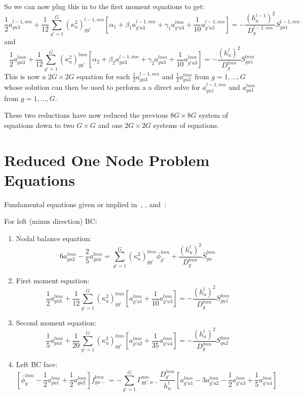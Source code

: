 So we can now plug this in to the first moment equations to get:
\[
\frac{1}{2}a_{gu3}^{l-1,mn}+\frac{1}{12}\sum_{g'=1}^G(\kappa_u^2)_{gg'}^{l-1,mn}\left[\alpha_1+\beta_1a_{g'u3}^{l-1,mn}+\gamma_1a_{g'u3}^{lmn}+\frac{1}{10}a_{g'u3}^{l-1,mn}\right]=-\frac{(h_u^{l-1})^2}{D_g^{l-1,mn}}S_{gu1}^{l-1,mn}
\]
and
\[
\frac{1}{2}a_{gu3}^{lmn}+\frac{1}{12}\sum_{g'=1}^G(\kappa_u^2)_{gg'}^{lmn}\left[\alpha_2+\beta_2a_{gu3}^{l-1,mn}+\gamma_2a_{gu3}^{lmn}+\frac{1}{10}a_{g'u3}^{lmn}\right]=-\frac{(h_u^{l})^2}{D_g^{lmn}}S_{gu1}^{lmn}
\]
This is now a $2G\times 2G$ equation for each $\frac{1}{2}a_{gu3}^{l-1,mn}$ and $\frac{1}{2}a_{gu3}^{lmn}$ from $g=1,\dots,G$ whose solution can then be used to perform a a direct solve for $a_{gu1}^{l-1,mn}$ and $a_{gu1}^{lmn}$ from $g=1,\dots,G$.

These two reductions have now reduced the previous $8G\times 8G$ system of equations down to two $G\times G$ and one $2G\times 2G$ systems of equations.

\section{Reduced One Node Problem Equations}

Fundamental equations given or implied in~\cite{GehinPhD}, \cite{SmithMS}, and~\cite{Smith1983Nonlinear}:

For left (minus direction) BC:
\begin{enumerate}
    \item Nodal balance equation:
        \[
        6a_{gu2}^{lmn}-\frac{2}{5}a_{gu4}^{lmn}=\sum_{g'=1}^G(\kappa_u^2)_{gg'}^{lmn}\bar{\phi}_{g'}^{lmn}+\frac{(h_u^{l})^2}{D_g^{lmn}}\bar{S}_{gu}^{lmn}
        \]
    \item First moment equation:
        \[
        \frac{1}{2}a_{gu3}^{lmn}+\frac{1}{12}\sum_{g'=1}^G(\kappa_u^2)_{gg'}^{lmn}\left[a_{g'u1}^{lmn}+\frac{1}{10}a_{g'u3}^{lmn}\right]=-\frac{(h_u^{l})^2}{D_g^{lmn}}S_{gu1}^{lmn}
        \]
    \item Second moment equation:
        \[
        \frac{1}{5}a_{gu4}^{lmn}+\frac{1}{20}\sum_{g'=1}^G(\kappa_u^2)_{gg'}^{lmn}\left[a_{g'u2}^{lmn}+\frac{1}{35}a_{g'u4}^{lmn}\right]=-\frac{(h_u^{l})^2}{D_g^{lmn}}S_{gu2}^{lmn}
        \]
    \item Left BC face:
        \[
        \left[\bar{\phi}_{g}^{lmn}-\frac{1}{2}a_{gu1}^{lmn}+\frac{1}{2}a_{gu2}^{lmn}\right]f_{gu-}^{lmn}=-\sum_{g'=1}^G\Gamma_{gg',u-}^{mn}\frac{D_{g'}^{lmn}}{h_u^{l}}\left[a_{g'u1}^{lmn}-3a_{g'u2}^{lmn}-\frac{1}{2}a_{g'u3}^{lmn}+\frac{1}{5}a_{g'u4}^{lmn}\right]
        \]
\end{enumerate}

